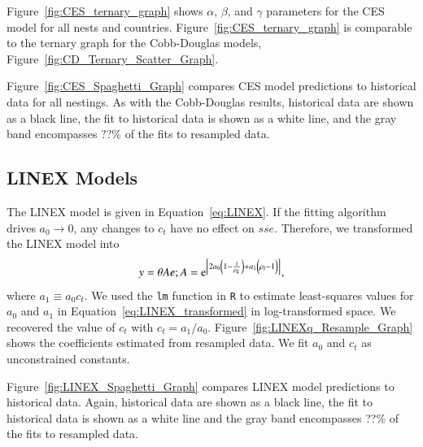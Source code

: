 \documentclass[preprint,authoryear,12pt]{elsarticle}\usepackage[]{graphicx}\usepackage[]{color}
\begin{document}
Figure~\ref{fig:CES_ternary_graph} shows 
$\alpha$, $\beta$, and $\gamma$ parameters for the CES model for all nests and countries.
Figure~\ref{fig:CES_ternary_graph} is comparable to
the ternary graph for the Cobb-Douglas models, 
Figure~\ref{fig:CD_Ternary_Scatter_Graph}.



Figure~\ref{fig:CES_Spaghetti_Graph} compares CES model predictions 
to historical data for all nestings. 
As with the Cobb-Douglas results, 
historical data are shown as a black line, 
the fit to historical data is shown as a white line, and 
the gray band encompasses ??\% of the fits to resampled data.




\subsection{LINEX Models}
\label{sec:LINEX_Parameter_Estimation}

The LINEX model is given in Equation~\ref{eq:LINEX}. 
If the fitting algorithm drives $a_0 \rightarrow 0$, 
any changes to $c_t$ have no effect on $sse$. 
Therefore, we transformed the LINEX model into
%
\begin{equation} \label{eq:LINEX_transformed}
  y = \theta A e; 
  A = \mathrm{e}^{\left[2 a_0 \left(1 - \frac{1}{\rho_k} \right) 
    + a_1 \left(\vphantom{\frac{1}{\rho_k}}\rho_l - 1 \right)\right]},
\end{equation}
%
\noindent where $a_1 \equiv a_0 c_t$. 
We used the \texttt{lm} function in \texttt{R}
\citep{R} to estimate least-squares values for $a_0$ and $a_1$ in 
Equation~\ref{eq:LINEX_transformed} in log-transformed space. 
We recovered the value of $c_t$ with $c_t = a_1 / a_0$. 
Figure~\ref{fig:LINEXq_Resample_Graph}
shows the coefficients estimated from resampled data.
We fit $a_0$ and $c_t$ as unconstrained constants.

Figure~\ref{fig:LINEX_Spaghetti_Graph} compares LINEX model predictions to historical data.
Again, historical data are shown as a black line, 
the fit to historical data is shown as a white line and 
the gray band encompasses ??\% of the fits to resampled data.

\twocolumn{}



\onecolumn{}
\end{document}
